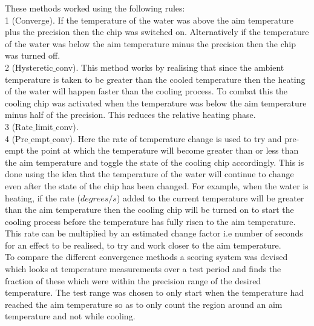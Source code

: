 \documentclass[10pt]{article}
\begin{document}
These methods worked using the following rules:\\ %

1 (Converge). If the temperature of the water was above the aim temperature plus the precision then the chip was switched on. Alternatively if the temperature of the water was below the aim temperature minus the precision then the chip was turned off.\\

2 (Hysteretic$\_$conv). This method works by realising that since the ambient temperature is taken to be greater than the cooled temperature then the heating of the water will happen faster than the cooling process. To combat this the cooling chip was activated when the temperature was below the aim temperature minus half of the precision. This reduces the relative heating phase.\\

3 (Rate$\_$limit$\_$conv). \\

4 (Pre$\_$empt$\_$conv). Here the rate of temperature change is used to try and pre-empt the point at which the temperature will become greater than or less than the aim temperature and toggle the state of the cooling chip accordingly. This is done using the idea that the temperature of the water will continue to change even after the state of the chip has been changed. For example, when the water is heating, if the rate ($degrees/s$) added to the current temperature will be greater than the aim temperature then the cooling chip will be turned on to start the cooling process before the temperature has fully risen to the aim temperature. This rate can be multiplied by an estimated change factor i.e number of seconds for an effect to be realised, to try and work closer to the aim temperature.\\

To compare the different convergence methods a scoring system was devised which looks at temperature measurements over a test period and finds the fraction of these which were within the precision range of the desired temperature. The test range was chosen to only start when the temperature had reached the aim temperature so as to only count the region around an aim temperature and not while cooling. \\
\end{document}
